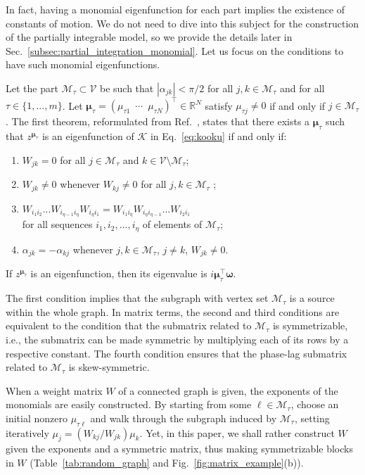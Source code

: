 \documentclass[aps,pre,reprint,longbibliography,superscriptaddress,noshowpacs,floatfix]{revtex4-2}
\theoremstyle{definition}
\theoremstyle{remark}
\begin{document}
In fact, having a monomial eigenfunction for each part implies the existence of constants of motion. We do not need to dive into this subject for the construction of the partially integrable model, so we provide the details later in Sec.~\ref{subsec:partial_integration_monomial}. Let us focus on the conditions to have such monomial eigenfunctions.

Let the part $\mathcal{M}_\tau \subset \mathcal{V}$ be such that $|\alpha_{jk}| < \pi/2$ for all $j,k\in\mathcal{M}_\tau$ and for all $\tau \in \{1,...,m\}$. Let $\bm \mu_\tau = (\mu_{\tau 1}\,\,\,\cdots\,\,\,\mu_{\tau N})^\top \in \mathbb{R}^N$ satisfy $\mu_{\tau j} \neq 0$ if and only if $j \in \mathcal{M}_\tau$.  The first theorem, reformulated from Ref.~\cite{Thibeault2026}, states that there exists a $\bm{\mu}_\tau$ such that $z^{\bm \mu_\tau}$ is an eigenfunction of $\mathcal{K}$ in Eq.~\eqref{eq:kooku} if and only if: 
\begin{enumerate}[label=\normalfont1.\arabic*.,ref=1.\arabic*]
    \item \label{itm:1.1} $W_{jk} = 0$ for all $j\in \mathcal{M}_\tau$ and $k\in \mathcal{V}\setminus\mathcal{M}_\tau$;
    \item \label{itm:1.2} $W_{jk}\neq 0$ whenever $W_{kj}\neq 0$ for all $j,k\in \mathcal{M}_\tau$ ;
    \item \label{itm:1.3} $W_{i_1 i_2} ... W_{i_{\eta-1}i_{\eta}}W_{{i_{\eta} i_1}} = W_{{i_1 i_{\eta}}}W_{i_{\eta}i_{\eta-1}} ... W_{i_2 i_1}$\\ for all sequences $i_1, i_2, ..., i_\eta$ of elements of $\mathcal{M}_\tau$;
    \item \label{itm:1.4} 
    $\alpha_{jk} = -\alpha_{kj}$ whenever  $j,k\in \mathcal{M}_\tau$,  $j\neq k$, $W_{jk}\neq 0$.
\end{enumerate}
If $z^{\bm{\mu}_\tau}$ is an eigenfunction, then its eigenvalue is $i\bm{\mu}_\tau^\top\bm{\omega}$.

The first condition implies that the subgraph with vertex set $\mathcal{M}_\tau$ is a source within the whole graph. In matrix terms, the second and third conditions are equivalent to the condition that the submatrix related to $\mathcal{M}_\tau$ is symmetrizable, i.e., the submatrix can be made symmetric by multiplying each of its rows by a respective constant. The fourth condition ensures that the phase-lag submatrix related to $\mathcal{M}_\tau$ is skew-symmetric. 

When a weight matrix $W$ of a connected graph is given, the exponents of the monomials are easily constructed. By starting from some $\ell\in\mathcal{M}_\tau$, choose an initial nonzero $\mu_{\tau\ell}$ and walk through the subgraph induced by $\mathcal{M}_\tau$, setting iteratively \mbox{$\mu_j = (W_{k j}/W_{jk}) \mu_k$}. Yet, in this paper, we shall rather construct $W$ given the exponents and a symmetric matrix, thus making symmetrizable blocks in $W$ (Table~\ref{tab:random_graph} and Fig.~\ref{fig:matrix_example}(b)).
\end{document}
